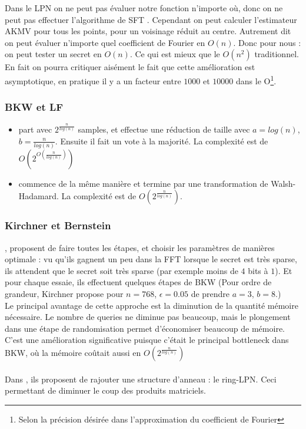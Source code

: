 \documentclass{article}		%
\theoremstyle{definition}
\theoremstyle{plain}
\theoremstyle{plain}
\theoremstyle{plain}
\theoremstyle{plain}
\theoremstyle{plain}
\begin{document}
Dans le LPN on ne peut pas évaluer notre fonction n'importe où, donc on
ne peut pas effectuer l'algorithme de SFT \cite{Akavia}. Cependant on peut calculer
l'estimateur AKMV pour tous les points, pour un voisinage réduit au
centre.  Autrement dit on peut évaluer n'importe quel coefficient de
Fourier en $O(n)$. Donc pour nous : on peut tester un secret en $O(n)$.
Ce qui est mieux que le $O(n^2)$ traditionnel. \\
En fait on pourra critiquer aisément le fait que cette amélioration est
asymptotique, en pratique il y a un facteur entre $1000$ et $10000$ dans
le O\footnote{Selon la précision désirée dans l'approximation du
coefficient de Fourier}. 
\subsubsection{BKW et LF}
\begin{itemize}
\item \cite{BKW} part avec $2^\frac{n}{log(n)}$ samples, et effectue une
réduction de taille avec $a=log(n)$, $b = \frac{n}{log(n)}$.
Ensuite il fait un vote à la majorité. La complexité
est de $O(2^{O(\frac {n} {log(n)})})$   
\item \cite{LF} commence de la même manière et termine par une
transformation de Walsh-Hadamard. La complexité est de
$O(2^\frac{n}{log(n)})$.
\end{itemize}
\subsubsection{Kirchner et Bernstein}
\cite{Bernstein}, \cite{Kirchner} proposent de faire toutes les étapes, et
choisir les paramètres de manières optimale : vu qu'ils gagnent un peu
dans la FFT lorsque le secret est très sparse, ils attendent que le
secret soit très sparse (par exemple moins de $4$ bits à $1$). Et pour
chaque essaie, ils effectuent quelques étapes de BKW (Pour ordre de
grandeur, Kirchner propose
pour $n=768$, $\epsilon=0.05$ de prendre $a=3$, $b=8$.)
\\Le principal avantage de cette approche est la diminution de la
quantité mémoire nécessaire. Le nombre de queries ne diminue pas
beaucoup, mais le plongement dans une étape de randomisation permet
d'économiser beaucoup de mémoire. C'est une amélioration significative
puisque c'était le principal bottleneck dans BKW, où la mémoire coûtait
aussi en $O(2^\frac{n}{log(n)})$ 
\\\\
Dans \cite{Bernstein}, ils proposent de rajouter une structure
d'anneau : le ring-LPN. Ceci permettant de diminuer le coup des produits
matriciels.  
\end{document}

